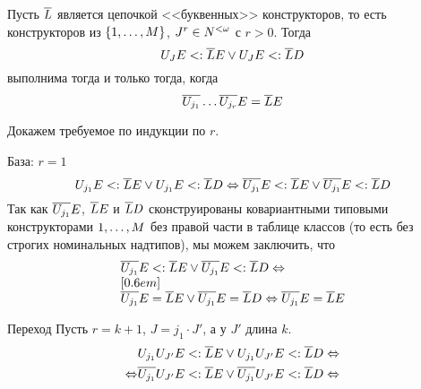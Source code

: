 \begin{lem}{\label{lem:pcpuletter}}
    Пусть $\overline{{L}{}}$ является цепочкой <<буквенных>> конструкторов, то есть конструкторов из  $\{{1}{},\ldots,{M}{}\}$, $J^r\in N^{<\omega}$ с  $r > 0$. Тогда
\[
    {U}_{J}{E} <: \overline{{L}{}}{E} \lor {U}_{J}{E} <: \overline{{L}{}}D
\]
выполнима тогда и только тогда, когда
\[
     \overline{{U}_{j_1}}\ldots\overline{{U}_{j_r}}{E} = \overline{{L}{}}{E}
\]
\end{lem}
\begin{proof*}
Докажем требуемое по индукции по $r$.

\begin{paragraph}{База: $r = 1$}
\[
    {U}_{j_1}{E} <: \overline{{L}{}}{E} \lor {U}_{j_1}{E} <: \overline{{L}{}}D \Leftrightarrow \overline{{U}_{j_1}}{E} <: \overline{{L}{}}{E} \lor \overline{{U}_{j_1}}{E} <: \overline{{L}{}}D
\]
Так как $\overline{{U}_{j_1}}{E}$, $\overline{{L}{}}{E}$ и $\overline{{L}{}}D$ сконструированы ковариантными типовыми конструкторами ${1},\ldots,{M}$ без правой части в таблице классов (то есть без строгих номинальных надтипов), мы можем заключить, что
\[
    \begin{array}{l}
        \overline{{U}_{j_1}}{E} <: \overline{{L}{}}{E} \lor \overline{{U}_{j_1}}{E} <: \overline{{L}{}}D
        \Leftrightarrow \\
        [0.6em] \\
        \overline{{U}_{j_1}}{E} = \overline{{L}{}}{E} \lor \overline{{U}_{j_1}}{E} = \overline{{L}{}}D
        \Leftrightarrow \overline{{U}_{j_1}}{E} = \overline{{L}{}}{E}
    \end{array}
\]
\end{paragraph}

\begin{paragraph}{Переход}
Пусть $r = k + 1$, $J = j_1 \cdot J'$, а у $J'$ длина $k$.
\begin{align*}
    &{U}_{j_1}{U}_{J'}{E} <: \overline{{L}{}} {E} \lor {U}_{j_1}{U}_{J'}{E} <: \overline{{L}{}}D \Leftrightarrow \\
     \Leftrightarrow &\overline{{U}_{j_1}}{U}_{J'}{E} <: \overline{{L}{}} {E} \lor \overline{{U}_{j_1}}{U}_{J'}{E} <: \overline{{L}{}}D \Leftrightarrow
\end{align*}
%


\end{paragraph}
\end{proof*}
